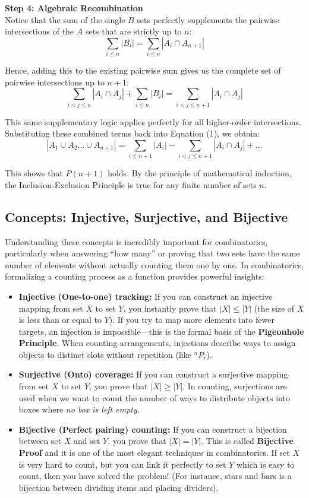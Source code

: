 \documentclass[12pt]{article}
\begin{document}
\textbf{Step 4: Algebraic Recombination}\\
Notice that the sum of the single $B$ sets perfectly supplements the pairwise intersections of the $A$ sets that are strictly up to $n$:
\[
\sum_{i \le n} |B_i| = \sum_{i \le n} |A_i \cap A_{n+1}|
\]

Hence, adding this to the existing pairwise sum gives us the complete set of pairwise intersections up to $n+1$:
\[
\sum_{i < j \le n} |A_i \cap A_j| + \sum_{i \le n} |B_i| = \sum_{i < j \le n+1} |A_i \cap A_j|
\]

This same supplementary logic applies perfectly for all higher-order intersections. Substituting these combined terms back into Equation (1), we obtain:
\[
|A_1 \cup A_2 \dots \cup A_{n+1}| = \sum_{i \le n+1} |A_i| - \sum_{i < j \le n+1} |A_i \cap A_j| + \dots
\]

This shows that $P(n+1)$ holds. By the principle of mathematical induction, the Inclusion-Exclusion Principle is true for any finite number of sets $n$.

\subsection{Concepts: Injective, Surjective, and Bijective}

Understanding these concepts is incredibly important for combinatorics, particularly when answering ``how many'' or proving that two sets have the same number of elements without actually counting them one by one. In combinatorics, formalizing a counting process as a function provides powerful insights:
\begin{itemize}[leftmargin=*]
  \item \textbf{Injective (One-to-one) tracking:} If you can construct an injective mapping from set $X$ to set $Y$, you instantly prove that $|X| \le |Y|$ (the size of $X$ is less than or equal to $Y$). If you try to map more elements into fewer targets, an injection is impossible---this is the formal basis of the \textbf{Pigeonhole Principle}. When counting arrangements, injections describe ways to assign objects to distinct slots without repetition (like ${}^nP_r$).
  \item \textbf{Surjective (Onto) coverage:} If you can construct a surjective mapping from set $X$ to set $Y$, you prove that $|X| \ge |Y|$. In counting, surjections are used when we want to count the number of ways to distribute objects into boxes where \emph{no box is left empty}. 
  \item \textbf{Bijective (Perfect pairing) counting:} If you can construct a bijection between set $X$ and set $Y$, you prove that $|X| = |Y|$. This is called \textbf{Bijective Proof} and it is one of the most elegant techniques in combinatorics. If set $X$ is very hard to count, but you can link it perfectly to set $Y$ which is easy to count, then you have solved the problem! (For instance, stars and bars is a bijection between dividing items and placing dividers).
\end{itemize}
\end{document}
